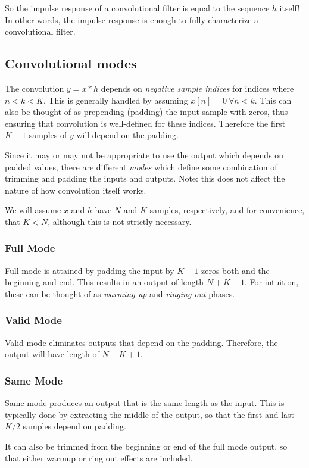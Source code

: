 \documentclass{article}
\begin{document}
So the impulse response of a convolutional filter is equal to the sequence $h$ itself!
In other words, the impulse response is enough to fully characterize a convolutional
filter.

\subsection{Convolutional modes}
The convolution $y = x * h$ depends on {\it negative sample indices} for 
indices where $n < k < K$. This is generally handled by assuming
$x[n] = 0 \ \forall n<k$. This can also be thought of as prepending (padding) the
input sample with zeros, thus ensuring that convolution is well-defined for
these indices. Therefore the first $K - 1$ samples of $y$ will depend on the 
padding.

Since it may or may not be appropriate to use the output which depends on
padded values, there are different {\it modes} which define some combination of
trimming and padding the inputs and outputs. Note: this does not affect the nature
of how convolution itself works.

We will assume $x$ and $h$ have $N$ and $K$ samples, respectively, and for
convenience, that $K < N$, although this is not strictly necessary.

\subsubsection{Full Mode}
Full mode is attained by padding the input by $K - 1$ zeros both and the beginning
and end. This results in an output of length $N + K - 1$. For intuition, these
can be thought of as {\it warming up} and {\it ringing out} phases.

\subsubsection{Valid Mode}
Valid mode eliminates outputs that depend on the padding. Therefore, the output
will have length of $N - K + 1$.

\subsubsection{Same Mode}
Same mode produces an output that is the same length as the input. This is typically
done by extracting the middle of the output, so that the first and last $K/2$ samples
depend on padding.

It can also be trimmed from the beginning or end of the full mode output, so that
either warmup or ring out effects are included.
\end{document}
